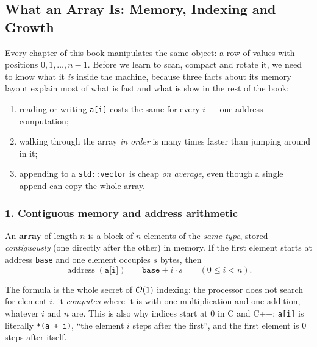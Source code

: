 \subsection{What an Array Is: Memory, Indexing and Growth}
\label{ssec:ch1-array}

Every chapter of this book manipulates the same object: a row of values with positions $0, 1, \dots, n-1$. Before we learn to scan, compact and rotate it, we need to know what it \emph{is} inside the machine, because three facts about its memory layout explain most of what is fast and what is slow in the rest of the book:
\begin{enumerate}[leftmargin=*]
    \item reading or writing \texttt{a[i]} costs the same for every $i$ --- one address computation;
    \item walking through the array \emph{in order} is many times faster than jumping around in it;
    \item appending to a \texttt{std::vector} is cheap \emph{on average}, even though a single append can copy the whole array.
\end{enumerate}

\subsubsection*{1. Contiguous memory and address arithmetic}

\begin{definitionbox}[Array]
An \textbf{array} of length $n$ is a block of $n$ elements of the \emph{same type}, stored \emph{contiguously} (one directly after the other) in memory. If the first element starts at address \texttt{base} and one element occupies $s$ bytes, then
\[
\operatorname{address}(\texttt{a[i]}) \;=\; \texttt{base} + i \cdot s \qquad (0 \le i < n).
\]
\end{definitionbox}

The formula is the whole secret of $\mathcal{O}(1)$ indexing: the processor does not search for element $i$, it \emph{computes} where it is with one multiplication and one addition, whatever $i$ and $n$ are. This is also why indices start at 0 in C and C++: \texttt{a[i]} is literally \texttt{*(a + i)}, ``the element $i$ steps after the first'', and the first element is $0$ steps after itself.


